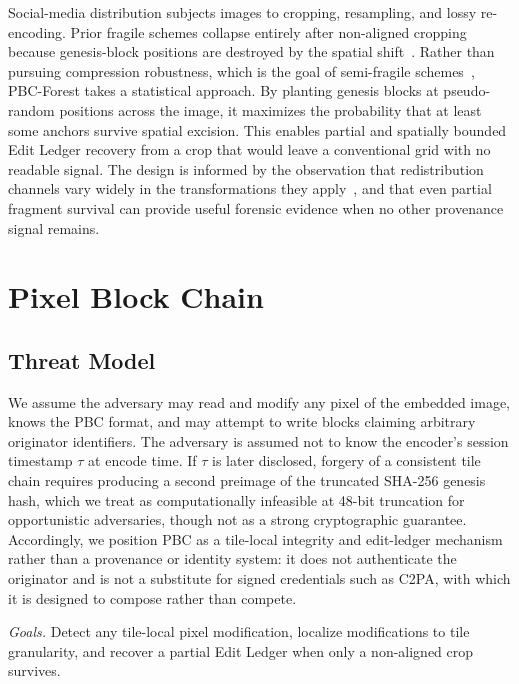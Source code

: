 \documentclass[conference]{IEEEtran}
\begin{document}
Social-media distribution subjects images to cropping, resampling, and
lossy re-encoding. Prior fragile schemes collapse entirely after
non-aligned cropping because genesis-block positions are destroyed by
the spatial shift~\cite{korus2017survey}. Rather than pursuing
compression robustness, which is the goal of semi-fragile
schemes~\cite{lin2001semifragile}, PBC-Forest takes a statistical
approach. By planting genesis blocks at pseudo-random positions across
the image, it maximizes the probability that at least some anchors
survive spatial excision. This enables partial and spatially bounded
Edit Ledger recovery from a crop that would leave a conventional grid
with no readable signal. The design is informed by the observation that
redistribution channels vary widely in the transformations they
apply~\cite{corvi2023synthetic}, and that even partial fragment survival
can provide useful forensic evidence when no other provenance signal
remains.

\section{Pixel Block Chain}
\label{sec:method}

\subsection{Threat Model}
\label{sec:threat}

We assume the adversary may read and modify any pixel of the embedded
image, knows the PBC format, and may attempt to write blocks claiming
arbitrary originator identifiers. The adversary is assumed not to know
the encoder's session timestamp $\tau$ at encode time. If $\tau$ is
later disclosed, forgery of a consistent tile chain requires producing
a second preimage of the truncated SHA-256 genesis hash, which we
treat as computationally infeasible at 48-bit truncation for
opportunistic adversaries, though not as a strong cryptographic
guarantee. Accordingly, we position PBC as a tile-local integrity and edit-ledger mechanism rather than a provenance or identity system: it does not authenticate the originator and is not a substitute for signed credentials such as C2PA, with which it is designed to compose rather than compete.

\emph{Goals.} Detect any tile-local pixel modification, localize
modifications to tile granularity, and recover a partial Edit Ledger
when only a non-aligned crop survives.
\end{document}
